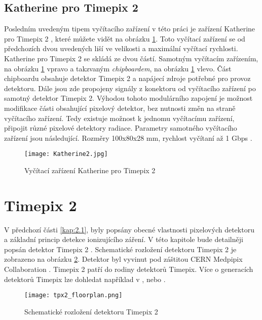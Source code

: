 \subsection{Katherine pro Timepix 2} %
\label{Katherine}
Posledním uvedeným tipem vyčítacího zařízení v této práci je zařízení Katherine pro Timepix 2 \cite{Burian_2020}, které můžete vidět na obrázku \ref{fig:Katherine2}. Toto vyčítací zařízení se od předchozích dvou uvedených liší ve velikosti a maximální vyčítací rychlosti. Katherine pro Timepix 2 se skládá ze dvou částí. Samotným vyčítacím zařízením, na obrázku \ref{fig:Katherine2} vpravo a takzvaným \textit{chipboardem}, na obrázku \ref{fig:Katherine2} vlevo. Část chipboardu obsahuje detektor Timepix 2 a napájecí zdroje potřebné pro provoz detektoru. Dále jsou zde propojeny signály z konektoru od vyčítacího zařízení po samotný detektor Timepix 2. Výhodou tohoto modulárního zapojení je možnost modifikace části obsahující pixelový detektor, bez nutnosti změn na straně vyčítacího zařízení. Tedy existuje možnost k jednomu vyčítacímu zařízení, připojit různé pixelové detektory radiace. Parametry samotného vyčítacího zařízení jsou následující. Rozměry 100x80x28 mm, rychlost vyčítaní až 1 Gbps \cite{Burian_2020}.
\begin{figure}[h!]
	\centering
	\captionsetup{justification=centering}
	\texttt{[image: Katherine2.jpg]}
	\caption{Vyčítací zařízení Katherine pro Timepix 2 \cite{Burian_2020}} 
	\label{fig:Katherine2}
\end{figure}	


\section{Timepix 2}
\label{Timepix2}
V předchozí části \ref{kap:2.1}, byly popsány obecné vlastnosti pixelových detektoru a základní princip detekce ionizujícího záření. V této kapitole bude detailněji popsán detektor Timepix 2 \cite{tpx2_manual}. Schematické rozložení detektoru Timepix 2 je zobrazeno na obrázku \ref{fig:tpx2_floorplan}. Detektor byl vyvinut pod záštitou CERN Medpipix Collaboration \cite{Medpix}. Timepix 2 patří do rodiny detektorů Timepix. Více o generacích detektorů Timepix lze dohledat například v \cite{Llopart},  \cite{Timepix3} nebo \cite{Timepix4}.  
\begin{figure}[h!]
	\centering
	\captionsetup{justification=centering}
	\texttt{[image: tpx2\_floorplan.png]}
	\caption{Schematické rozložení detektoru Timepix 2 \cite{tpx2_manual}} 
	\label{fig:tpx2_floorplan}
\end{figure}	

